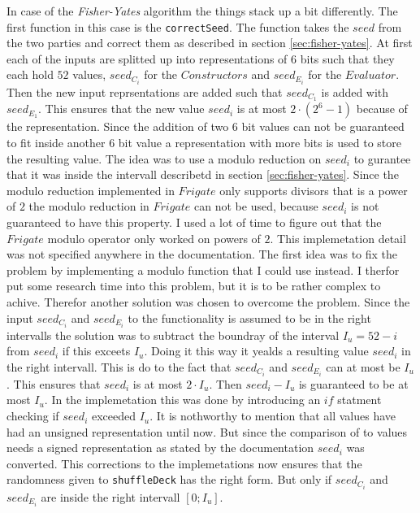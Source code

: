 \documentclass[twoside,11pt,openright]{report}
\newcommand{\FY}{\textit{Fisher-Yates} }
\begin{document}
\bigskip

In case of the \FY algorithm the things stack up a bit differently. The first function in this case is the \verb|correctSeed|. The function takes the $seed$ from the two parties and correct them as described in section \ref{sec:fisher-yates}. At first each of the inputs are splitted up into representations of $6$ bits such that they each hold $52$ values, $seed_{C_i}$ for the $Constructors$ and $seed_{E_i}$ for the $Evaluator$. Then the new input reprsentations are added such that $seed_{C_1}$ is added with $seed_{E_1}$. This ensures that the new value $seed_i$ is at most $2\cdot (2^6 - 1)$ because of the representation. Since the addition of two $6$ bit values can not be guaranteed to fit inside another $6$ bit value a representation with more bits is used to store the resulting value.
The idea was to use a modulo reduction on $seed_i$ to gurantee that it was inside the intervall describetd in section \ref{sec:fisher-yates}. Since the modulo reduction implemented in $Frigate$ only supports divisors that is a power of $2$ the modulo reduction in $Frigate$ can not be used, because $seed_i$ is not guaranteed to have this property. I used a lot of time to figure out that the $Frigate$ modulo operator only worked on powers of $2$. This implemetation detail was not specified anywhere in the documentation. The first idea was to fix the problem by implementing a modulo function that I could use instead. I therfor put some research time into this problem, but it is to be rather complex to achive. Therefor another solution was chosen to overcome the problem. Since the input $seed_{C_i}$ and $seed_{E_i}$ to the functionality is assumed to be in the right intervalls the solution was to subtract the boundray of the interval $I_u=52-i$ from $seed_i$ if this exceets $I_u$. Doing it this way it yealds a resulting value $seed_i$ in the right intervall. This is do to the fact that $seed_{C_i}$ and $seed_{E_i}$ can at most be $I_u$. This ensures that $seed_i$ is at most $2\cdot I_u$. Then $seed_i - I_u$ is guaranteed to be at most $I_u$.
In the implemetation this was done by introducing an $if$ statment checking if $seed_i$ exceeded $I_u$. It is nothworthy to mention that all values have had an unsigned representation until now. But since the comparison of to values needs a signed representation as stated by the documentation $seed_i$ was converted. This corrections to the implemetations now ensures that the randomness given to \verb|shuffleDeck| has the right form. But only if $seed_{C_i}$ and $seed_{E_i}$ are inside the right intervall $[0;I_u]$.
\end{document}
